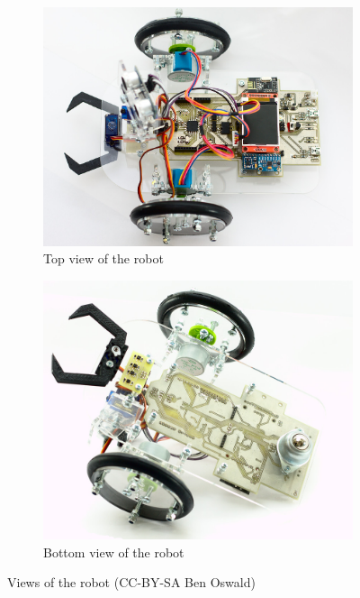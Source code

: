 \begin{figure}[H]
  \centering
  \begin{subfigure}{0.48\textwidth}
  \centering
  \includegraphics[width=0.9\linewidth]{images/30_robot_top.jpg}
  \caption{Top view of the robot}
  \end{subfigure}
  \begin{subfigure}{0.48\textwidth}
  \centering
  \includegraphics[width=0.9\linewidth]{images/30_robot_bottom.jpg}
  \caption{Bottom view of the robot}
  \end{subfigure}
  \caption{Views of the robot (CC-BY-SA Ben Oswald)}
\end{figure} 

